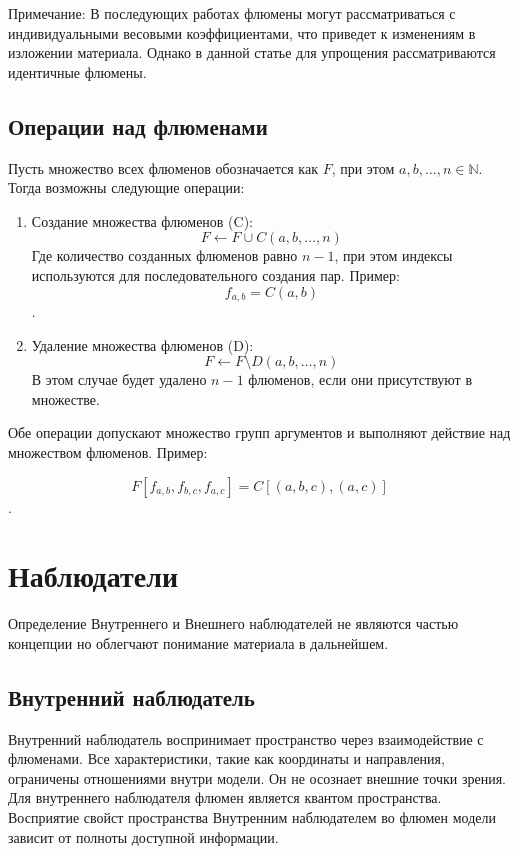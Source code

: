\documentclass[final]{article}
\begin{document}
        Примечание: В последующих работах флюмены могут рассматриваться с 
        индивидуальными весовыми коэффициентами, что приведет к изменениям в 
        изложении материала. Однако в данной статье для упрощения 
        рассматриваются идентичные флюмены.


    \subsection{Операции над флюменами}

        Пусть множество всех флюменов обозначается как \( F \), при этом \( a, b, \dots, 
        n \in \mathbb{N} \). Тогда возможны следующие операции:

        \begin{enumerate}

            \item Создание множества флюменов (C): \[ F \leftarrow F \cup C(a,b, 
            \dots, n) \] Где количество созданных флюменов равно \( n-1 \), при этом 
            индексы используются для последовательного создания пар. Пример: \[ 
            f_{a,b}=C(a,b) \].

            \item Удаление множества флюменов (D): \[ F \leftarrow F \setminus 
            D(a,b, \dots, n) \] В этом случае будет удалено \( n-1 \) флюменов, если 
            они присутствуют в множестве.

        \end{enumerate} 

        Обе операции допускают множество групп аргументов и выполняют 
        действие над множеством флюменов. Пример: 

        \[ F[f_{a,b}, f_{b,c}, f_{a,c}] = C[(a,b,c), (a,c)]\].


    \section{Наблюдатели}

        Определение Внутреннего и Внешнего наблюдателей не являются частью концепции
        но облегчают понимание материала в дальнейшем.

        \subsection{Внутренний наблюдатель}

            Внутренний наблюдатель воспринимает пространство через 
            взаимодействие с флюменами. Все характеристики, такие как координаты 
            и направления, ограничены отношениями внутри модели. Он не осознает 
            внешние точки зрения. Для внутреннего наблюдателя флюмен является 
            квантом пространства. Восприятие свойст пространства Внутренним 
            наблюдателем во флюмен модели зависит от полноты доступной 
            информации.
\end{document}
